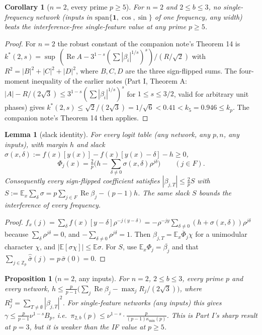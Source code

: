 \documentclass[11pt]{article}
\newtheorem{lemma}[theorem]{Lemma}
\newtheorem{proposition}[theorem]{Proposition}
\newtheorem{corollary}[theorem]{Corollary}
\theoremstyle{definition}
\renewcommand{\Re}{\operatorname{Re}}
\begin{document}
\begin{corollary}[$n=2$, every prime $p\ge5$]\label{cor:n2}
For $n=2$ and $2\le b\le3$, no single-frequency network (inputs in $\mathrm{span}\{\mathbf1,\cos,\sin\}$ of one frequency,
any width) beats the interference-free single-feature value at any prime $p\ge5$.
\end{corollary}
\begin{proof}
For $n=2$ the robust constant of the companion note's Theorem 14 is $k^*(2,s)=\sup\,(\Re A-3^{1-s}(\sum|\beta_i|^{1/s})^s)/(R/\sqrt2)$
with $R^2=|B|^2+|C|^2+|D|^2$, where $B,C,D$ are the three sign-flipped sums.  The four-moment inequality of the earlier notes
(Part I, Theorem A: $|A|-R/(2\sqrt3)\le3^{1-s}(\sum|\beta_i|^{1/s})^s$ for $1\le s\le3/2$, valid for arbitrary unit phases) gives
$k^*(2,s)\le\sqrt2/(2\sqrt3)=1/\sqrt6<0.41<k_5=0.946\le k_p$.  The companion note's Theorem 14 then applies.
\end{proof}
\begin{lemma}[slack identity]\label{lem:slack}
For every logit table (any network, any $p,n$, any inputs), with margin $h$ and slack
$\sigma(x,\delta):=f(x)[y(x)]-f(x)[y(x)-\delta]-h\ge0$,
\[\Phi_j(x)=\tfrac2p\Big(h-\sum_{\delta\ne0}\sigma(x,\delta)\rho^{j\delta}\Big)\qquad(j\in F).\]
Consequently every sign-flipped coefficient satisfies $|\beta_{j,T}|\le\frac2pS$ with
$S:=\mathbb E_x\sum_\delta\sigma=p\sum_{j\in F}\Re\beta_j-(p-1)h$.  The same slack $S$ bounds the interference of
\emph{every} frequency.
\end{lemma}
\begin{proof}
$\hat f_x(j)=\sum_\delta f(x)[y-\delta]\rho^{-j(y-\delta)}=-\rho^{-jy}\sum_{\delta\ne0}(h+\sigma(x,\delta))\rho^{j\delta}$ because
$\sum_{\delta}\rho^{j\delta}=0$, and $-\sum_{\delta\ne0}\rho^{j\delta}=1$.  Then $\beta_{j,T}=\overline{\mathbb E_x\Phi_j\chi}$ for a unimodular
character $\chi$, and $|\mathbb E[\sigma\chi]|\le\mathbb E\sigma$.  For $S$, use $\mathbb E_x\Phi_j=\overline{\beta_j}$ and that
$\sum_{j\in\mathbb Z_p}\hat{\bar\sigma}(j)=p\,\bar\sigma(0)=0$.
\end{proof}
\begin{proposition}[$n=2$, any inputs]\label{prop:n2gen}
For $n=2$, $2\le b\le3$, every prime $p$ and every network, $h\le\frac p{p-1}\big(\sum_j\Re\beta_j-\max_jR_j/(2\sqrt3)\big)$,
where $R_j^2=\sum_{T\ne\emptyset}|\beta_{j,T}|^2$.  For single-feature networks (any inputs) this gives
$\gamma\le\frac{p}{p-1}\nu^{1-s}B_p$, i.e.\ $\pi_{2,b}(p)\le\nu^{1-s}\cdot\frac{p}{(p-1)\kappa_{\min}(p)}$.  This is Part I's
sharp result at $p=3$, but it is weaker than the IF value at $p\ge5$.
\end{proposition}
\end{document}
